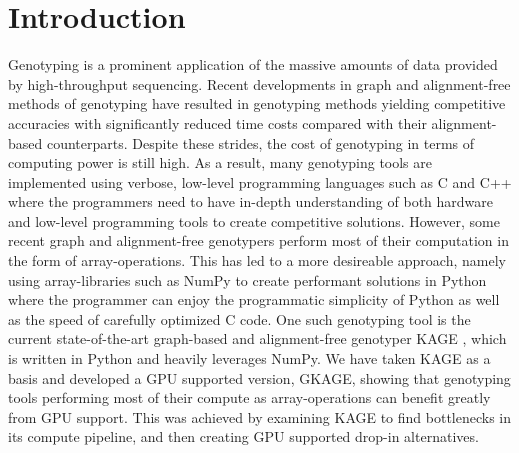 \section*{Introduction}

Genotyping is a prominent application of the massive amounts of data provided by high-throughput sequencing. 
Recent developments in graph and alignment-free methods of genotyping have resulted in genotyping methods yielding competitive accuracies with significantly reduced time costs compared with their alignment-based counterparts.
Despite these strides, the cost of genotyping in terms of computing power is still high.
As a result, many genotyping tools are implemented using verbose, low-level programming languages such as C and C++ where the programmers need to have in-depth understanding of both hardware and low-level programming tools to create competitive solutions.
However, some recent graph and alignment-free genotypers perform most of their computation in the form of array-operations. 
This has led to a more desireable approach, namely using array-libraries such as NumPy \cite{numpy} to create performant solutions in Python where the programmer can enjoy the programmatic simplicity of Python as well as the speed of carefully optimized C code.
One such genotyping tool is the current state-of-the-art graph-based and alignment-free genotyper KAGE \cite{kage}, which is written in Python and heavily leverages NumPy.
We have taken KAGE as a basis and developed a GPU supported version, GKAGE, showing that genotyping tools performing most of their compute as array-operations can benefit greatly from GPU support.
This was achieved by examining KAGE to find bottlenecks in its compute pipeline, and then creating GPU supported drop-in alternatives.


